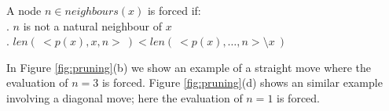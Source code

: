 \begin{definition}
\label{def:forced}
A node $n \in neighbours(x)$ is forced if: \\
. $n$ is not a natural neighbour of $x$\\
. $ len(~< p(x), x, n >~) < len(~ < p(x), \ldots, n > \setminus x~)$
\end{definition}
\par \noindent
In Figure \ref{fig:pruning}(b) we show an example of a straight move where 
the evaluation of $n = 3$ is forced. Figure \ref{fig:pruning}(d)  
shows an similar example involving a diagonal move; here the evaluation of
$n = 1$ is forced.
